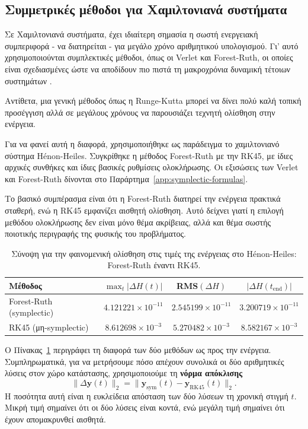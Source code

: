 \documentclass[11pt,a4paper]{report}
\begin{document}
\subsection{Συμμετρικές μέθοδοι για Χαμιλτονιανά συστήματα}
\label{subsec:symplectic-integrators-hamiltonian}

Σε Χαμιλτονιανά συστήματα, έχει
ιδιαίτερη σημασία η σωστή ενεργειακή συμπεριφορά - να διατηρείται - για μεγάλο χρόνο 
αριθμητικού υπολογισμού.
Γι' αυτό χρησιμοποιούνται συμπλεκτικές μέθοδοι, όπως οι Verlet και
Forest-Ruth, οι οποίες είναι σχεδιασμένες ώστε να αποδίδουν πιο πιστά τη
μακροχρόνια δυναμική τέτοιων συστημάτων
\cite{hairer_lubich_wanner,lubich_symplectic}.

Αντίθετα, μια γενική μέθοδος όπως η Runge-Kutta μπορεί να δίνει πολύ καλή
τοπική προσέγγιση αλλά σε μεγάλους χρόνους να παρουσιάζει τεχνητή ολίσθηση
στην ενέργεια.

Για να φανεί αυτή η διαφορά, χρησιμοποιήθηκε ως παράδειγμα το χαμιλτονιανό
σύστημα H\'enon-Heiles. Συγκρίθηκε η μέθοδος Forest-Ruth με την RK45, με ίδιες
αρχικές συνθήκες και ίδιες βασικές ρυθμίσεις ολοκλήρωσης. Οι εξισώσεις των
Verlet και Forest-Ruth δίνονται στο Παράρτημα~\ref{app:symplectic-formulas}.
\begin{resultsbox}
Το βασικό συμπέρασμα είναι ότι η Forest-Ruth διατηρεί την ενέργεια πρακτικά
σταθερή, ενώ η RK45 εμφανίζει αισθητή ολίσθηση. Αυτό δείχνει γιατί η επιλογή
μεθόδου ολοκλήρωσης δεν είναι μόνο θέμα ακρίβειας, αλλά και θέμα σωστής
ποιοτικής περιγραφής της φυσικής του προβλήματος.
\end{resultsbox}

\begin{table}[H]
  \centering
  \caption{Σύνοψη για την φαινομενική ολίσθηση στις τιμές της ενέργειας στο H\'enon-Heiles: Forest-Ruth έναντι RK45.}
  \label{tab:hh-energy-drift}
  \begin{tabular}{lccc}
    \hline
    Μέθοδος & $\max_t |\Delta H(t)|$ & RMS$(\Delta H)$ & $|\Delta H(t_{\mathrm{end}})|$ \\
    \hline
    Forest-Ruth (symplectic) & $4.121221\times10^{-11}$ & $2.545199\times10^{-11}$ & $3.200719\times10^{-11}$ \\
    RK45 (μη-symplectic) & $8.612698\times10^{-3}$ & $5.270482\times10^{-3}$ & $8.582167\times10^{-3}$ \\
    \hline
  \end{tabular}
\end{table}

Ο Πίνακας~\ref{tab:hh-energy-drift} περιγράφει τη διαφορά των δύο μεθόδων ως
προς την ενέργεια. Συμπληρωματικά, για να μετρήσουμε πόσο απέχουν συνολικά οι
δύο αριθμητικές λύσεις στον χώρο κατάστασης, χρησιμοποιούμε τη \textbf{νόρμα
απόκλισης}
\begin{equation}
\|\Delta \mathbf{y}(t)\|_2=
\|\mathbf{y}_{\mathrm{sym}}(t)-\mathbf{y}_{\mathrm{RK45}}(t)\|_2.
\end{equation}
Η ποσότητα αυτή είναι η ευκλείδεια απόσταση των δύο λύσεων τη χρονική στιγμή
$t$. Μικρή τιμή σημαίνει ότι οι δύο λύσεις είναι κοντά, ενώ μεγάλη τιμή
σημαίνει ότι έχουν απομακρυνθεί αισθητά.
\end{document}
